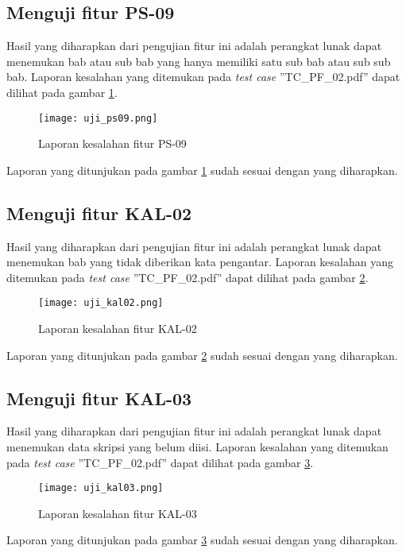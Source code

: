 \subsection{Menguji fitur PS-09}
Hasil yang diharapkan dari pengujian fitur ini adalah perangkat lunak dapat menemukan bab atau sub bab yang hanya memiliki satu sub bab atau sub sub bab. Laporan kesalahan yang ditemukan pada \textit{test case} ''TC\_PF\_02.pdf'' dapat dilihat pada gambar \ref{fig:ujips09}.

\begin{figure}[H]
	\centering	
	\texttt{[image: uji\_ps09.png]}
	\caption{Laporan kesalahan fitur PS-09}	
	\label{fig:ujips09} 
\end{figure}

Laporan yang ditunjukan pada gambar \ref{fig:ujips09} sudah sesuai dengan yang diharapkan.

\subsection{Menguji fitur KAL-02}
Hasil yang diharapkan dari pengujian fitur ini adalah perangkat lunak dapat menemukan bab yang tidak diberikan kata pengantar. Laporan kesalahan yang ditemukan pada \textit{test case} ''TC\_PF\_02.pdf'' dapat dilihat pada gambar \ref{fig:ujikal02}.

\begin{figure}[H]
	\centering	
	\texttt{[image: uji\_kal02.png]}
	\caption{Laporan kesalahan fitur KAL-02}	
	\label{fig:ujikal02} 
\end{figure}

Laporan yang ditunjukan pada gambar \ref{fig:ujikal02} sudah sesuai dengan yang diharapkan.

\subsection{Menguji fitur KAL-03}
Hasil yang diharapkan dari pengujian fitur ini adalah perangkat lunak dapat menemukan data skripsi yang belum diisi. Laporan kesalahan yang ditemukan pada \textit{test case} ''TC\_PF\_02.pdf'' dapat dilihat pada gambar \ref{fig:ujikal03}.

\begin{figure}[H]
	\centering	
	\texttt{[image: uji\_kal03.png]}
	\caption{Laporan kesalahan fitur KAL-03}	
	\label{fig:ujikal03} 
\end{figure}

Laporan yang ditunjukan pada gambar \ref{fig:ujikal03} sudah sesuai dengan yang diharapkan.

